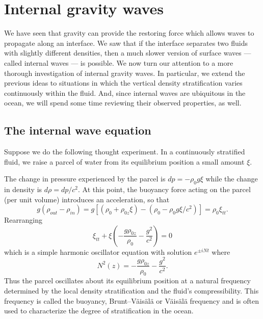 
\setcounter{chapter}{3}

\chapter{Internal gravity waves}

We have seen that gravity can provide the restoring force which allows waves to
propagate along an interface. We saw that if the interface separates two fluids with
slightly different densities, then a much slower version of surface waves --- called internal
waves --- is possible. We now turn our attention to a more thorough investigation of
internal gravity waves. In particular, we extend the previous ideas to situations in
which the vertical density stratification varies continuously within the fluid. And, since
internal waves are ubiquitous in the ocean, we will spend some time reviewing their
observed properties, as well.

\section{The internal wave equation}

Suppose we do the following thought experiment. In a continuously stratified fluid, we
raise a parcel of water from its equilibrium position a small amount $\xi$.

\sourcepagebreak


The change in pressure experienced by the parcel is $dp=-\rho_0g\xi$ while the change in
density is $d\rho=dp/c^2$. At this point, the buoyancy force acting on the parcel (per unit
volume) introduces an acceleration, so that
\[
	g(\rho_{out}-\rho_{in})
	=g[(\rho_0+\rho_{0z}\xi)-(\rho_0-\rho_0g\xi/c^2)]
	=\rho_0\xi_{tt}.
\]
Rearranging
\[
	\xi_{tt}+\xi\left(-\frac{g\rho_{0z}}{\rho_0}-\frac{g^2}{c^2}\right)=0
\]
which is a simple harmonic oscillator equation with solution $e^{\pm iNt}$ where
\[
	N^2(z)=-\frac{g\rho_{0z}}{\rho_0}-\frac{g^2}{c^2}.
\]
Thus the parcel oscillates about its equilibrium position at a natural frequency
determined by the local density stratification and the fluid's compressibility. This
frequency is called the buoyancy, Brunt--Väisälä or Väisälä frequency and is often used
to characterize the degree of stratification in the ocean.

